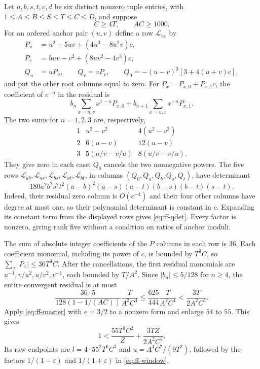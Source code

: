\documentclass[12pt]{article}
\numberwithin{equation}{section}
\begin{document}
Let $a,b,s,t,c,d$ be six distinct nonzero tuple entries, with
$1\le A\le B\le S\le T\le C\le D$, and suppose
\begin{equation}\label{eq:ff-qguards}
 C\ge4T,\qquad AC\ge1000.
\end{equation}
For an ordered anchor pair $(u,v)$ define a row $\mathcal L_{uv}$ by
\begin{align*}
 P_u&=u^2-5uv+(4u^3-8u^2v)c,\\
 P_v&=5uv-v^2+(8uv^2-4v^3)c,\\
 Q_u&=uP_u,\qquad Q_v=vP_v,\qquad
 Q_0=-(u-v)^3[3+4(u+v)c],
\end{align*}
and put the other root columns equal to zero.
For $P_x=P_{x,0}+P_{x,1}c$, the coefficient of $c^{-n}$ in the
residual is
\[
 b_n\sum_{x=u,v}x^{1-n}P_{x,0}
 +b_{n+1}\sum_{x=u,v}x^{-n}P_{x,1}.
\]
The two sums for $n=1,2,3$ are, respectively,
\[
 \begin{array}{c|cc}
 1&u^2-v^2&4(u^2-v^2)\\
 2&6(u-v)&12(u-v)\\
 3&5(u/v-v/u)&8(u/v-v/u).
 \end{array}
\]
They give zero in each case; $Q_0$ cancels the two nonnegative powers.
The five rows
$\mathcal L_{ab},\mathcal L_{as},\mathcal L_{bs},
\mathcal L_{at},\mathcal L_{bt}$, in columns $(Q_0,Q_a,Q_b,Q_s,Q_t)$,
have determinant
\begin{equation}\label{eq:ff-qdet}
 180a^2b^2s^2t^2(a-b)^2(a-s)(a-t)(b-s)(b-t)(s-t).
\end{equation}
Indeed, their residual zero column is $O(c^{-4})$ and their four other
columns have degree at most one, so their polynomial determinant is
constant in $c$. Expanding its constant term from the displayed rows
gives \eqref{eq:ff-qdet}. Every factor is nonzero, giving rank five
without a condition on ratios of anchor moduli.

The sum of absolute integer coefficients of the $P$ columns in each
row is $36$. Each coefficient monomial, including its power of $c$,
is bounded by $T^3C$, so $\sum_x|P_x|\le36T^3C$.
After the cancellations, the first residual monomials are
$u^{-1},v/u^2,u/v^2,v^{-1}$, each bounded by $T/A^2$.
Since $|b_n|\le5/128$ for $n\ge4$, the entire convergent residual is
at most
\[
 \frac{36\cdot5}{128(1-1/(AC))}\frac{T}{A^2C^4}
 \le\frac{625}{444}\frac{T}{A^2C^4}
 <\frac{3T}{2A^2C^4}.
\]
Apply \eqref{eq:ff-master} with $e=3/2$ to a nonzero form and enlarge
$54$ to $55$. This gives
\begin{equation}\label{eq:ff-Q}
 1<\frac{55T^3C^2}{Z}+\frac{3TZ}{2A^2C^4}.
\end{equation}
Its raw endpoints are
$l=4\cdot55^2T^6C^3$ and $u=A^4C^7/(9T^2)$, followed by the
factors $1/(1-\varepsilon)$ and $1/(1+\varepsilon)$ in
\eqref{eq:ff-window}.
\end{document}
